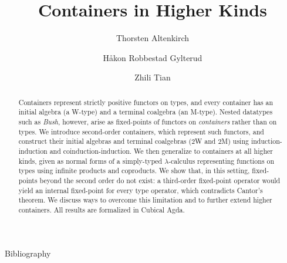 \documentclass[a4paper,USenglish,cleveref, autoref, thm-restate]{lipics-v2021}
\title{Containers in Higher Kinds}
\author{Thorsten Altenkirch}{School of Computer Science, University of Nottingham, UK
}{psztxa@nottingham.ac.uk}{https://orcid.org/0000-0002-6582-5025}{}
\author{Håkon Robbestad Gylterud}{Department of Informatics, University of Bergen, Norway}{hakon@gylterud.net}{https://orcid.org/0009-0009-9871-1110}{}
\author{Zhili Tian}{School of Computer Science, University of Nottingham, UK
}{pxszt8@nottingham.ac.uk}{https://orcid.org/0009-0009-6562-4889}{}
\begin{document}
\maketitle

\begin{abstract}
Containers represent strictly positive functors on types, and every container
has an initial algebra (a W-type) and a terminal coalgebra (an M-type). Nested
datatypes such as \emph{Bush}, however, arise as fixed-points of functors on
\emph{containers} rather than on types. We introduce second-order containers,
which represent such functors, and construct their initial algebras and
terminal coalgebras (2W and 2M) using induction-induction and
coinduction-induction. We then generalize to containers at all higher kinds,
given as normal forms of a simply-typed $\lambda$-calculus representing
functions on types using infinite products and coproducts. We show that, in this setting, fixed-points
beyond the second order do not exist: a third-order fixed-point operator would
yield an internal fixed-point for every type operator, which contradicts Cantor's
theorem. We discuss ways to overcome this limitation and to further extend
higher containers. All results are formalized in Cubical Agda.
\end{abstract}











Bibliography


\end{document}

